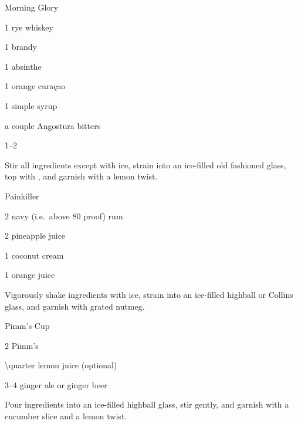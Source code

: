 \begin{Cocktail}{Morning Glory}
	\begin{Ingredients}
	\item \SI{1}{\oz} rye whiskey
	\item \SI{1}{\oz} brandy
	\item \SI{1}{\tsp} absinthe
	\item \SI{1}{\tsp} orange cura\c{c}ao
	\item \SI{1}{\tsp} simple syrup
	\item a couple \si{\dashes} Angostura bitters
	\item \SIrange{1}{2}{\oz} \soda\/
	\end{Ingredients}
	
	\begin{Instructions}
	Stir all ingredients except \soda\/ with ice, strain into an ice-filled old fashioned glass, top with \soda\/, and garnish with a lemon twist.
	\end{Instructions}
\end{Cocktail}

\begin{Cocktail}{Painkiller}
	\begin{Ingredients}
	\item \SI{2}{\oz} navy (i.e.\ above 80 proof) rum
	\item \SI{2}{\oz} pineapple juice
	\item \SI{1}{\oz} coconut cream
	\item \SI{1}{\oz} orange juice
	\end{Ingredients}
	
	\begin{Instructions}
	Vigorously shake ingredients with ice, strain into an ice-filled highball or Collins glass, and garnish with grated nutmeg.
	\end{Instructions}
\end{Cocktail}

\begin{Cocktail}{Pimm's Cup}
	\begin{Ingredients}
	\item \SI{2}{\oz} Pimm's \No 1
	\item \SI{\quarter}{\oz} lemon juice (optional)
	\item \SIrange{3}{4}{\oz} ginger ale or ginger beer
	\end{Ingredients}
	
	\begin{Instructions}
	Pour ingredients into an ice-filled highball glass, stir gently, and garnish with a cucumber slice and a lemon twist.
	\end{Instructions}
\end{Cocktail}

